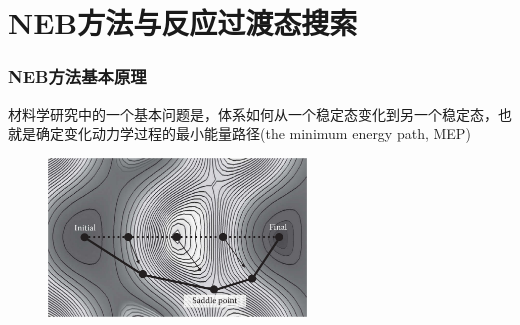 \section{NEB方法与反应过渡态搜索}
\frame
{
	\frametitle{\textrm{NEB}方法基本原理}
材料学研究中的一个基本问题是，体系如何从一个稳定态变化到另一个稳定态，也就是确定变化动力学过程的最小能量路径\textrm{(the minimum energy path, MEP)}%
\vskip 5pt
{\fontsize{7.2pt}{5.2pt}}
\begin{figure}[h!]
	\vskip -10pt
\centering
\includegraphics[width=2.7in,viewport=0 0 770 530,clip]{Figures/Pt_NEB.png}
\caption{\fontsize{7.2pt}{5.2pt}}%
\label{Pt_NEB}
\end{figure}
}
